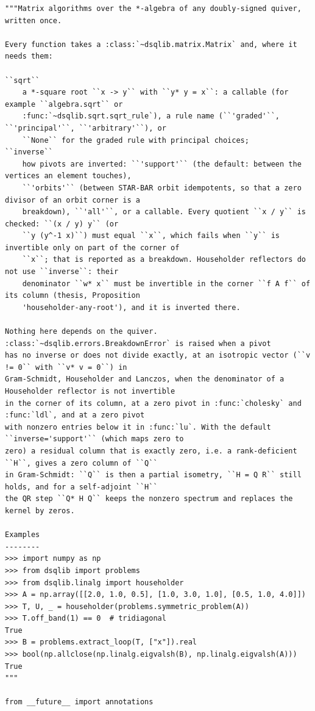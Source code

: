 \documentclass[12pt, a4paper]{report}
\theoremstyle{plain}
\theoremstyle{definition}
\theoremstyle{remark}
\theoremstyle{plain}
\begin{document}
\begin{lstlisting}[style=dsqcode]
"""Matrix algorithms over the *-algebra of any doubly-signed quiver, written once.

Every function takes a :class:`~dsqlib.matrix.Matrix` and, where it needs them:

``sqrt``
    a *-square root ``x -> y`` with ``y* y = x``: a callable (for example ``algebra.sqrt`` or
    :func:`~dsqlib.sqrt.sqrt_rule`), a rule name (``'graded'``, ``'principal'``, ``'arbitrary'``), or
    ``None`` for the graded rule with principal choices;
``inverse``
    how pivots are inverted: ``'support'`` (the default: between the vertices an element touches),
    ``'orbits'`` (between STAR-BAR orbit idempotents, so that a zero divisor of an orbit corner is a
    breakdown), ``'all'``, or a callable. Every quotient ``x / y`` is checked: ``(x / y) y`` (or
    ``y (y^-1 x)``) must equal ``x``, which fails when ``y`` is invertible only on part of the corner of
    ``x``; that is reported as a breakdown. Householder reflectors do not use ``inverse``: their
    denominator ``w* x`` must be invertible in the corner ``f A f`` of its column (thesis, Proposition
    'householder-any-root'), and it is inverted there.

Nothing here depends on the quiver. :class:`~dsqlib.errors.BreakdownError` is raised when a pivot
has no inverse or does not divide exactly, at an isotropic vector (``v != 0`` with ``v* v = 0``) in
Gram-Schmidt, Householder and Lanczos, when the denominator of a Householder reflector is not invertible
in the corner of its column, at a zero pivot in :func:`cholesky` and :func:`ldl`, and at a zero pivot
with nonzero entries below it in :func:`lu`. With the default ``inverse='support'`` (which maps zero to
zero) a residual column that is exactly zero, i.e. a rank-deficient ``H``, gives a zero column of ``Q``
in Gram-Schmidt: ``Q`` is then a partial isometry, ``H = Q R`` still holds, and for a self-adjoint ``H``
the QR step ``Q* H Q`` keeps the nonzero spectrum and replaces the kernel by zeros.

Examples
--------
>>> import numpy as np
>>> from dsqlib import problems
>>> from dsqlib.linalg import householder
>>> A = np.array([[2.0, 1.0, 0.5], [1.0, 3.0, 1.0], [0.5, 1.0, 4.0]])
>>> T, U, _ = householder(problems.symmetric_problem(A))
>>> T.off_band(1) == 0  # tridiagonal
True
>>> B = problems.extract_loop(T, ["x"]).real
>>> bool(np.allclose(np.linalg.eigvalsh(B), np.linalg.eigvalsh(A)))
True
"""

from __future__ import annotations


\end{lstlisting}
\end{document}
